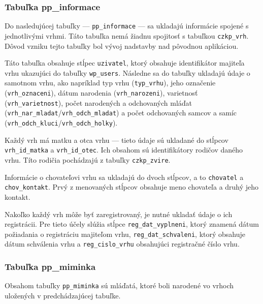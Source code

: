\subsubsection*{Tabuľka pp\_informace}

Do nasledujúcej tabuľky --- \texttt{pp_informace} --- sa ukladajú informácie spojené s jednotlivými vrhmi. Táto tabuľka nemá žiadnu spojitosť s tabuľkou \texttt{czkp_vrh}. Dôvod vzniku tejto tabuľky bol vývoj nadstavby nad pôvodnou aplikáciou.

Táto tabuľka obsahuje stĺpec \texttt{uzivatel}, ktorý obsahuje identifikátor majiteľa vrhu ukazujúci do tabuľky \texttt{wp_users}. Následne sa do tabuľky ukladajú údaje o samotnom vrhu, ako napríklad typ vrhu (\texttt{typ_vrhu}), jeho označenie (\texttt{vrh_oznaceni}), dátum narodenia (\texttt{vrh_narozeni}), varietnosť \\(\texttt{vrh_varietnost}), počet narodených a odchovaných mláďat \\ (\texttt{vrh_nar_mladat}/\texttt{vrh_odch_mladat}) a počet odchovaných samcov a samíc (\texttt{vrh_odch_kluci}/\texttt{vrh_odch_holky}).

Každý vrh má matku a otca vrhu --- tieto údaje sú ukladané do stĺpcov \texttt{vrh_id_matka} a \texttt{vrh_id_otec}. Ich obsahom sú identifikátory rodičov daného vrhu. Títo rodičia pochádzajú z tabuľky \texttt{czkp_zvire}.

Informácie o chovateľovi vrhu sa ukladajú do dvoch stĺpcov, a to \texttt{chovatel} a \texttt{chov_kontakt}. Prvý z menovaných stĺpcov obsahuje meno chovateľa a druhý jeho kontakt.

Nakoľko každý vrh môže byť zaregistrovaný, je nutné ukladať údaje o ich registrácii. Pre tieto účely slúžia stĺpce  \texttt{reg_dat_vyplneni}, ktorý znamená dátum požiadania o registráciu majiteľom vrhu, \texttt{reg_dat_schvaleni}, ktorý obsahuje dátum schválenia vrhu a \texttt{reg_cislo_vrhu} obsahujúci registračné číslo vrhu.

\subsubsection*{Tabuľka pp\_miminka}

Obsahom tabuľky \texttt{pp_miminka} sú mláďatá, ktoré boli narodené vo vrhoch uložených v predchádzajúcej tabuľke.


